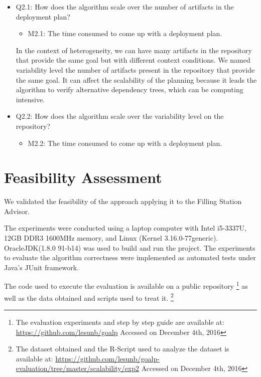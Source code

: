 \begin{itemize}
  \item Q2.1: How does the algorithm scale over the number of artifacts in the deployment plan?
  \begin{itemize}
    \item M2.1: The time consumed to come up with a deployment plan.
  \end{itemize}

  In the context of heterogeneity, we can have many artifacts in the repository that provide the same goal but with different context conditions.
  We named variability level the number of artifacts present in the repository that provide the same goal. It can affect the scalability of the planning because it leads the algorithm to verify alternative dependency trees, which can be computing intensive.

  \item Q2.2: How does the algorithm scale over the variability level on the repository?
  \begin{itemize}
    \item M2.2: The time consumed to come up with a deployment plan.
  \end{itemize}
\end{itemize}

\section{Feasibility Assessment}

We validated the feasibility of the approach applying it to the Filling Station Advisor.

The experiments were conducted using a laptop computer with Intel i5-3337U, 12GB DDR3 1600MHz memory, and Linux (Kernel 3.16.0-77generic). OracleJDK(1.8.0 91-b14) was used to build and run the project.
The experiments to evaluate the algorithm correctness
were implemented as automated tests under Java’s JUnit framework.

The code used to execute the evaluation is available on a public repository
\footnote{The evaluation experiments and step by step guide are available at:
\url{https://github.com/lesunb/goalp} Accessed on December 4th, 2016}
as well as the data obtained and scripts used to treat it.
\footnote{The dataset obtained and the R-Script\cite{the_r_foundation_r_2016} used to analyze the dataset is available at:
\url{https://github.com/lesunb/goalp-evaluation/tree/master/scalability/exp2} Accessed on December 4th, 2016}

